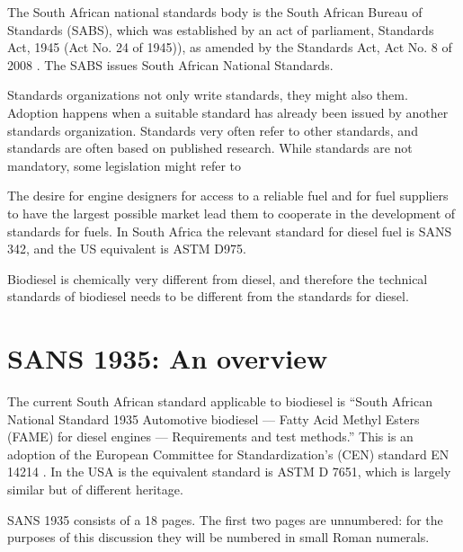 The South African national standards body is the South African Bureau of
Standards (SABS), which was established by an act of parliament,
 Standards Act, 1945 (Act No. 24 of 1945)), as amended by the Standards Act, Act
 No. 8 of 2008 \autocite{Act8-2008}. The SABS issues South African National
 Standards.

Standards organizations not only write standards, they might also
 them. Adoption happens when a suitable standard has already been
issued by another standards organization. Standards very often refer to other
standards, and standards are often based on published research. While standards
are not mandatory, some legislation might refer to 

The desire for engine designers for access to a reliable fuel and for fuel
suppliers to have the largest possible market lead them to cooperate in the
development of standards for fuels. In South Africa the relevant standard for
diesel fuel is SANS 342, and the US equivalent is ASTM D975.

Biodiesel is chemically very different from diesel, and therefore the technical
standards of biodiesel needs to be different from the standards for diesel.


\section{SANS 1935: An overview}

The current South African standard applicable to biodiesel is ``South African
National Standard 1935 Automotive biodiesel — Fatty Acid Methyl Esters (FAME)
for diesel engines — Requirements and test methods.'' \autocite{SANS1935} This
is an adoption of the European Committee for Standardization's (CEN) standard EN
14214 \autocite{EN14214}. In the USA is the equivalent standard is ASTM D 7651,
which is largely similar but of different heritage.

SANS 1935 consists of a 18 pages. The first two pages are unnumbered: for the
purposes of this discussion they will be numbered in small Roman numerals.

